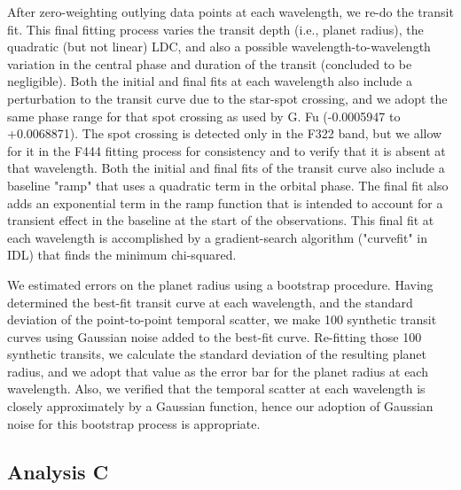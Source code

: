 \documentclass[sn-standardnature]{sn-jnl}%
\begin{document}
After zero-weighting outlying data points at each wavelength, we re-do the transit fit.  This final fitting process varies the transit depth (i.e., planet radius), the quadratic (but not linear) LDC, and also a possible wavelength-to-wavelength variation in the central phase and duration of the transit (concluded to be negligible). Both the initial and final fits at each wavelength also include a perturbation to the transit curve due to the star-spot crossing, and we adopt the same phase range for that spot crossing as used by G. Fu (-0.0005947 to +0.0068871). The spot crossing is detected only in the F322 band, but we allow for it in the F444 fitting process for consistency and to verify that it is absent at that wavelength. Both the initial and final fits of the transit curve also include a baseline "ramp"  that uses a quadratic term in the orbital phase.  The final fit also adds an exponential term in the ramp function that is intended to account for a transient effect in the baseline at the start of the observations. This final fit at each wavelength is accomplished by a gradient-search algorithm ("curvefit" in IDL) that finds the minimum chi-squared.

We estimated errors on the planet radius using a bootstrap procedure.  Having determined the best-fit transit curve at each wavelength, and the standard deviation of the point-to-point temporal scatter, we make 100 synthetic transit curves using Gaussian noise added to the best-fit curve.  Re-fitting those 100 synthetic transits, we calculate the standard deviation of the resulting planet radius, and we adopt that value as the error bar for the planet radius at each wavelength.  Also, we verified that the temporal scatter at each wavelength is closely approximately by a Gaussian function, hence our adoption of Gaussian noise for this bootstrap process is appropriate.


\subsection*{Analysis C}
\end{document}
